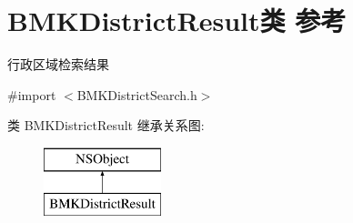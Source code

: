 \hypertarget{interface_b_m_k_district_result}{}\section{B\+M\+K\+District\+Result类 参考}
\label{interface_b_m_k_district_result}


行政区域检索结果  




{\ttfamily \#import $<$B\+M\+K\+District\+Search.\+h$>$}

类 B\+M\+K\+District\+Result 继承关系图\+:\begin{figure}[H]
\begin{center}
\leavevmode
\includegraphics[height=2.000000cm]{interface_b_m_k_district_result}
\end{center}
\end{figure}
